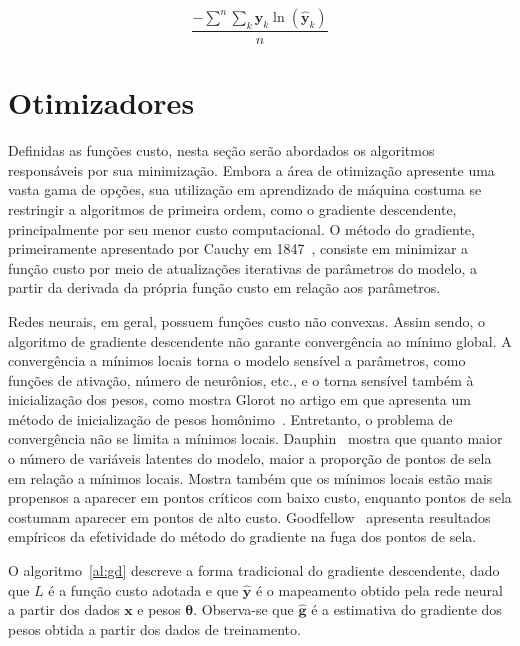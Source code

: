 \begin{equation} \label{eq:cec}
    \frac{-\displaystyle\sum^n \sum_k \mathbf{y}_k \ln(\mathbf{\hat{y}}_k)}{n}
\end{equation}

\section{Otimizadores} \label{sec:optimizers}

Definidas as funções custo, nesta seção serão abordados os algoritmos responsáveis por sua minimização. Embora a área de otimização apresente uma vasta gama de opções, sua utilização em aprendizado de máquina costuma se restringir a algoritmos de primeira ordem, como o gradiente descendente, principalmente por seu menor custo computacional. O método do gradiente, primeiramente apresentado por Cauchy em 1847~\cite{cauchy1847}, consiste em minimizar a função custo por meio de atualizações iterativas de parâmetros do modelo, a partir da derivada da própria função custo em relação aos parâmetros.

Redes neurais, em geral, possuem funções custo não convexas. Assim sendo, o algoritmo de gradiente descendente não garante convergência ao mínimo global. A convergência a mínimos locais torna o modelo sensível a parâmetros, como funções de ativação, número de neurônios, etc., e o torna sensível também à inicialização dos pesos, como mostra Glorot no artigo em que apresenta um método de inicialização de pesos homônimo~\cite{glorot10}. Entretanto, o problema de convergência não se limita a mínimos locais. Dauphin~\cite{dauphin14} mostra que quanto maior o número de variáveis latentes do modelo, maior a proporção de pontos de sela em relação a mínimos locais. Mostra também que os mínimos locais estão mais propensos a aparecer em pontos críticos com baixo custo, enquanto pontos de sela costumam aparecer em pontos de alto custo. Goodfellow~\cite{goodfellow14} apresenta resultados empíricos da efetividade do método do gradiente na fuga dos pontos de sela.

O algoritmo~\ref{al:gd} descreve a forma tradicional do gradiente descendente, dado que $L$ é a função custo adotada e que $\mathbf{\hat{y}}$ é o mapeamento obtido pela rede neural a partir dos dados $\mathbf{x}$ e pesos $\boldsymbol{\theta}$. Observa-se que $\mathbf{\hat{g}}$ é a estimativa do gradiente dos pesos obtida a partir dos dados de treinamento.

